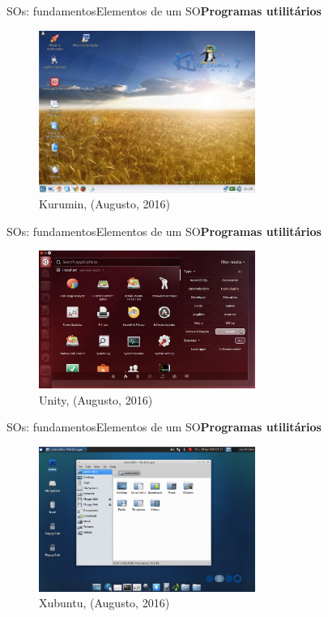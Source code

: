\documentclass{beamer}
\begin{document}
        \begin{frame}{SOs: fundamentos}{Elementos de um SO}{\bfseries{Programas utilitários}}
          \begin{figure}[!htb]
            \centering
            \includegraphics[width=200pt, keepaspectratio=true]{interfacesLinux/imagem-kurumin-7.jpg}
            \caption{Kurumin, (Augusto, 2016)}
            \label{imagem-kurumin-7}
          \end{figure}
        \end{frame}

        \begin{frame}{SOs: fundamentos}{Elementos de um SO}{\bfseries{Programas utilitários}}
          \begin{figure}[!htb]
            \centering
            \includegraphics[width=200pt, keepaspectratio=true]{interfacesLinux/unity.jpg}
            \caption{Unity, (Augusto, 2016)}
            \label{unity}
          \end{figure}
        \end{frame}

        \begin{frame}{SOs: fundamentos}{Elementos de um SO}{\bfseries{Programas utilitários}}
          \begin{figure}[!htb]
            \centering
            \includegraphics[width=200pt, keepaspectratio=true]{interfacesLinux/xubuntu.png}
            \caption{Xubuntu, (Augusto, 2016)}
            \label{xubuntu}
          \end{figure}
        \end{frame}
\end{document}
